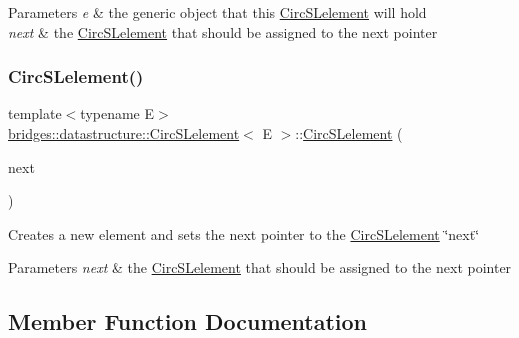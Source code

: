 \begin{DoxyParams}{Parameters}
{\em e} & the generic object that this \mbox{\hyperlink{classbridges_1_1datastructure_1_1_circ_s_lelement}{Circ\+S\+Lelement}} will hold \\
\hline
{\em next} & the \mbox{\hyperlink{classbridges_1_1datastructure_1_1_circ_s_lelement}{Circ\+S\+Lelement}} that should be assigned to the next pointer \\
\hline
\end{DoxyParams}
\mbox{\label{classbridges_1_1datastructure_1_1_circ_s_lelement_a89f06ba76b1fdf1d2343c5f18f226722}} 
\subsubsection{\texorpdfstring{Circ\+S\+Lelement()}{CircSLelement()}\hspace{0.1cm}{\footnotesize\ttfamily [4/4]}}
{\footnotesize\ttfamily template$<$typename E$>$ \\
\mbox{\hyperlink{classbridges_1_1datastructure_1_1_circ_s_lelement}{bridges\+::datastructure\+::\+Circ\+S\+Lelement}}$<$ E $>$\+::\mbox{\hyperlink{classbridges_1_1datastructure_1_1_circ_s_lelement}{Circ\+S\+Lelement}} (\begin{DoxyParamCaption}\item[{\mbox{\hyperlink{classbridges_1_1datastructure_1_1_circ_s_lelement}{Circ\+S\+Lelement}}$<$ E $>$ $\ast$}]{next }\end{DoxyParamCaption})\hspace{0.3cm}{\ttfamily [inline]}}

Creates a new element and sets the next pointer to the \mbox{\hyperlink{classbridges_1_1datastructure_1_1_circ_s_lelement}{Circ\+S\+Lelement}} \char`\"{}next\char`\"{} 
\begin{DoxyParams}{Parameters}
{\em next} & the \mbox{\hyperlink{classbridges_1_1datastructure_1_1_circ_s_lelement}{Circ\+S\+Lelement}} that should be assigned to the next pointer \\
\hline
\end{DoxyParams}


\subsection{Member Function Documentation}
\mbox{\label{classbridges_1_1datastructure_1_1_circ_s_lelement_a775ba08a7811fe91c396cb27ba9343ab}} 

